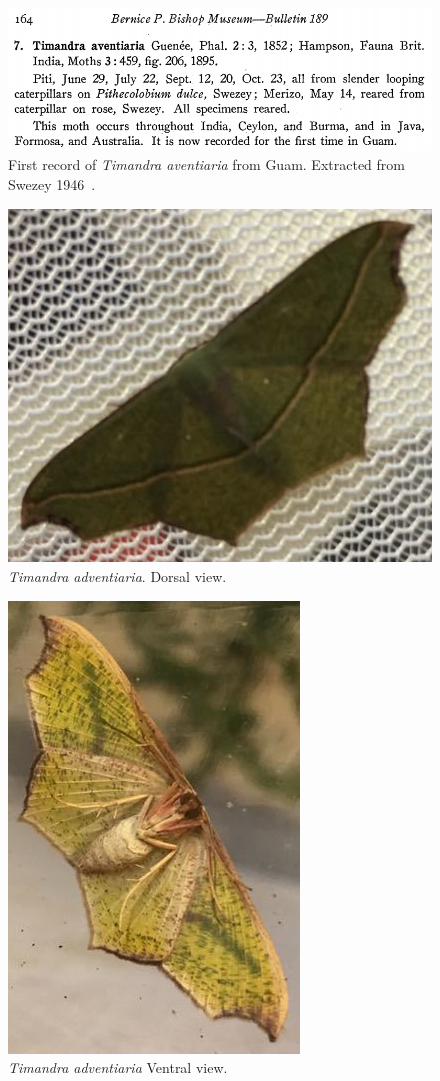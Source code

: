 \documentclass[english,letterpaper]{scrartcl}
\begin{document}
	

\begin{figure}[h]
	\centering
	\includegraphics[width=0.9\linewidth]{swezey}
	\caption{First record of \textit{Timandra aventiaria} from Guam. Extracted from Swezey 1946~\cite{Swezey1946}.}
	\label{fig:swezey}
\end{figure}

\begin{figure}[h]
	\centering
	\includegraphics[]{dorsal}
	\caption{\textit{Timandra adventiaria}. Dorsal view.}
	\label{fig:swezey}
\end{figure}

\begin{figure}[h]
	\centering
	\includegraphics[]{ventral}
	\caption{\textit{Timandra adventiaria} Ventral view.}
	\label{fig:swezey}
\end{figure}
\end{document}
